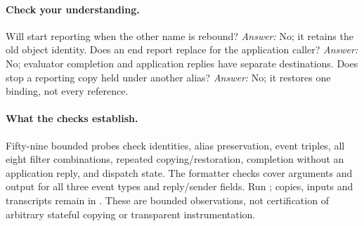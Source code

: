 \paragraph{Check your understanding.}
Will  start reporting when the other name is rebound?
\emph{Answer:} No; it retains the old object identity. Does an end report
replace \code{!} for the application caller? \emph{Answer:} No; evaluator
completion and application replies have separate destinations. Does
 stop a reporting copy held under another alias?
\emph{Answer:} No; it restores one binding, not every reference.

\paragraph{What the checks establish.}
Fifty-nine bounded probes check identities, alias preservation, event
triples, all eight filter combinations, repeated copying/restoration,
completion without an application reply, and dispatch state.
The formatter checks cover arguments and output for all three event types
and  reply/sender fields. Run ; copies,
inputs and transcripts remain in .
These are bounded observations, not certification of arbitrary stateful
copying or transparent instrumentation.
